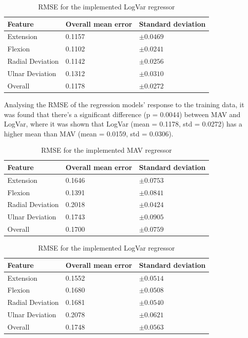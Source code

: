	\begin{table}[!thpb]
		\begin{center}
			\begin{tabular}{l l l}
				\hline
				\textbf{Feature} & \textbf{Overall mean error} & \textbf{Standard deviation}\\
				\hline
				Extension & 0.1157 & $\pm 0.0469$ \\
				Flexion & 0.1102 & $\pm 0.0241$ \\
				Radial Deviation & 0.1142 & $\pm 0.0256$ \\
				Ulnar Deviation & 0.1312 & $\pm 0.0310$ \\
				Overall & 0.1178 & $\pm 0.0272$ \\
				\hline
			\end{tabular}
			\caption{RMSE for the implemented LogVar regressor}
		\end{center}
	\end{table}
	
	Analysing the RMSE of the regression models' response to the training data, it was found that there's a significant difference (p = 0.0044) between MAV and LogVar, where it was shown that LogVar (mean = 0.1178, std = 0.0272) has a higher mean than MAV (mean = 0.0159, std = 0.0306).
	
	\begin{table}[!thpb]
		\begin{center}
			\begin{tabular}{l l l}
				\hline
				\textbf{Feature} & \textbf{Overall mean error} & \textbf{Standard deviation}\\
				\hline
				Extension & 0.1646 & $\pm 0.0753$ \\
				Flexion & 0.1391 & $\pm 0.0841$ \\
				Radial Deviation & 0.2018 & $\pm 0.0424$ \\
				Ulnar Deviation & 0.1743 & $\pm 0.0905$ \\
				Overall & 0.1700 & $\pm 0.0759$ \\
				\hline
			\end{tabular}
			\caption{RMSE for the implemented MAV regressor}
		\end{center}
	\end{table}
	
	
	\begin{table}[!thpb]
		\begin{center}
			\begin{tabular}{l l l}
				\hline
				\textbf{Feature} & \textbf{Overall mean error} & \textbf{Standard deviation}\\
				\hline
				Extension & 0.1552 & $\pm 0.0514$ \\
				Flexion & 0.1680 & $\pm 0.0508$ \\
				Radial Deviation & 0.1681 & $\pm 0.0540$ \\
				Ulnar Deviation & 0.2078 & $\pm 0.0621$ \\
				Overall & 0.1748 & $\pm 0.0563$ \\
				\hline
			\end{tabular}
			\caption{RMSE for the implemented LogVar regressor}
		\end{center}
	\end{table}
	

